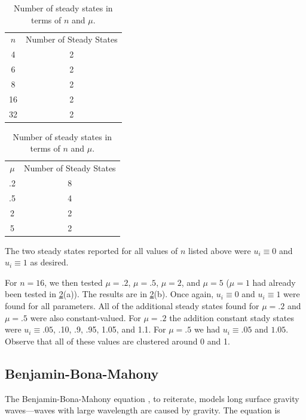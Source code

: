 \documentclass[11pt]{article}
\newcommand{\bhline}{\Xhline{2\arrayrulewidth}}
\begin{document}
\begin{table}
\begin{center}

\begin{tabular}{ | c | c | }
\hline
$n$ & Number of Steady States \\
\bhline
4 & 2 \\
\hline
6 & 2 \\
\hline
8 & 2 \\ 
\hline
16 & 2 \\
\hline
32 & 2 \\
\hline
\end{tabular}
\hspace{.5in}
\begin{tabular}{ | c | c | }
\hline
$\mu$ & Number of Steady States \\
\bhline
.2 & 8 \\
\hline
.5 & 4 \\ 
\hline
2 & 2 \\
\hline
5 & 2 \\
\hline
\end{tabular}

\caption{Number of steady states in terms of $n$ and $\mu$.}
\label{Fisher Statistics}
\end{center}
\end{table}

The two steady states reported for all values of $n$ listed above were $u_i \equiv 0$ and $u_i \equiv 1$ as desired.

For $n = 16$, we then tested $\mu = .2$, $\mu = .5$, $\mu = 2$, and $\mu = 5$ ($\mu = 1$ had already been tested in \cref{Fisher Statistics}(a)). The results are in \cref{Fisher Statistics}(b). Once again, $u_i \equiv 0$ and $u_i \equiv 1$ were found for all parameters. All of the additional steady states found for $\mu = .2$ and $\mu = .5$ were also constant-valued. For $\mu = .2$ the addition constant stady states were $u_i \equiv .05$, .10, .9, .95, 1.05, and 1.1. For $\mu = .5$ we had $u_i \equiv .05$ and $1.05$. Observe that all of these values are clustered around 0 and 1.

\subsection{Benjamin-Bona-Mahony}\label{sec:bbm}

The Benjamin-Bona-Mahony equation \citep{BBM}, to reiterate, models long surface gravity waves---waves with large wavelength are caused by gravity. The equation is
\end{document}
